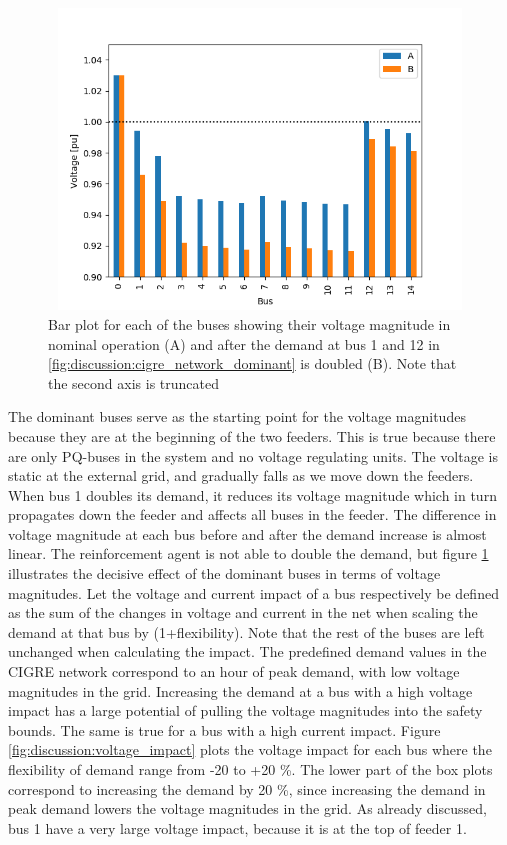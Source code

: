 \documentclass[class=book, crop=false]{standalone}
\begin{document}
\begin{figure}[h]
    \center
\includegraphics[height=8cm, width=12cm]{figures/double_large_load.png}
    \caption[size = 9]{Bar plot for each of the buses showing their voltage magnitude in nominal operation (A) and after the demand at bus 1 and 12 in \ref{fig:discussion:cigre_network_dominant} is doubled (B). Note that the second axis is truncated}
    \label{fig:discussion:double_large_load}
\end{figure}
The dominant buses serve as the starting point for the voltage magnitudes because they are at the beginning of the two feeders. This is true because there are only PQ-buses in the system and no voltage regulating units. The voltage is static at the external grid, and gradually falls as we move down the feeders. When bus 1 doubles its demand, it reduces its voltage magnitude which in turn propagates down the feeder and affects all buses in the feeder. The difference in voltage magnitude at each bus before and after the demand increase is almost linear. The reinforcement agent is not able to double the demand, but figure \ref{fig:discussion:double_large_load} illustrates the decisive effect of the dominant buses in terms of voltage magnitudes. Let the voltage and current impact of a bus respectively be defined as the sum of the changes in voltage and current in the net when scaling the demand at that bus by (1+flexibility). Note that the rest of the buses are left unchanged when calculating the impact. The predefined demand values in the CIGRE network correspond to an hour of peak demand, with low voltage magnitudes in the grid. Increasing the demand at a bus with a high voltage impact has a large potential of pulling the voltage magnitudes into the safety bounds. The same is true for a bus with a high current impact. Figure \ref{fig:discussion:voltage_impact} plots the voltage impact for each bus where the flexibility of demand range from -20 to +20 \%. The lower part of the box plots correspond to increasing the demand by 20 \%, since increasing the demand in peak demand lowers the voltage magnitudes in the grid. As already discussed, bus 1 have a very large voltage impact, because it is at the top of feeder 1. 
\end{document}

